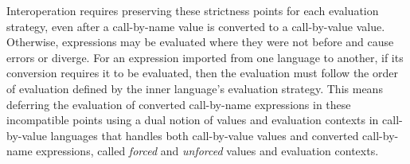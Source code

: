 Interoperation requires preserving these strictness points for each evaluation strategy, even after a call-by-name value is converted to a call-by-value value. Otherwise, expressions may be evaluated where they were not before and cause errors or diverge. For an expression imported from one language to another, if its conversion requires it to be evaluated, then the evaluation must follow the order of evaluation defined by the inner language's evaluation strategy. This means deferring the evaluation of converted call-by-name expressions in these incompatible points using a dual notion of values and evaluation contexts in call-by-value languages that handles both call-by-value values and converted call-by-name expressions, called \emph{forced} and \emph{unforced} values and evaluation contexts.